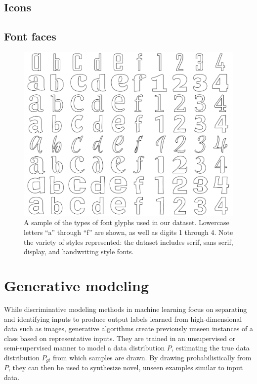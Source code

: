 \subsection{Icons}
\subsection{Font faces}

\begin{figure}[]
	\includegraphics[width=\textwidth]{figures/input_fonts}
    \caption[A sample of the types of font faces used in our fonts dataset]{A sample of the types of font glyphs used in our dataset. Lowercase letters ``a'' through ``f'' are shown, as well as digits 1 through 4. Note the variety of styles represented: the dataset includes serif, sans serif, display, and handwriting style fonts.\label{fig:input_fonts}}
\end{figure}

\section{Generative modeling}
While discriminative modeling methods in machine learning focus on separating and identifying inputs to produce output labels learned from high-dimensional data such as images, generative algorithms create previously unseen instances of a class based on representative inputs. They are trained in an unsupervised or semi-supervised manner to model a data distribution $P$, estimating the true data distribution $P_{gt}$ from which samples are drawn. By drawing probabilistically from $P$, they can then be used to synthesize novel, unseen examples similar to input data.

